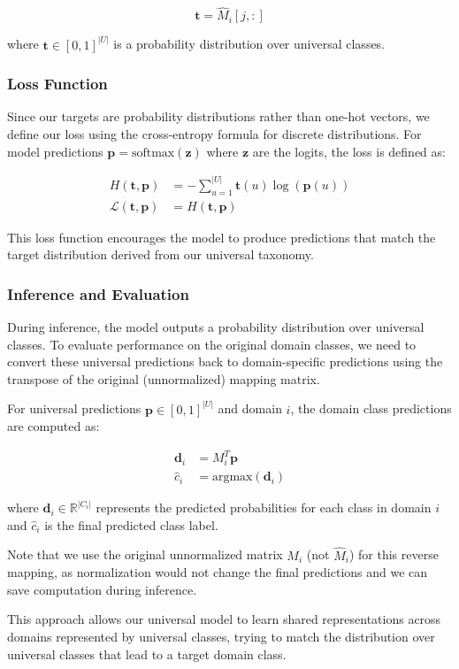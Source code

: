 \begin{equation}
      \mathbf{t} = \hat{M}_i[j, :]
\end{equation}

where $\mathbf{t} \in [0,1]^{|U|}$ is a probability distribution over universal classes.

\subsubsection{Loss Function}

Since our targets are probability distributions rather than one-hot vectors,
we define our loss using the cross-entropy formula for discrete distributions.
For model predictions $\mathbf{p} = \text{softmax}(\mathbf{z})$ where $\mathbf{z}$ are the logits,
the loss is defined as:

\begin{equation}
      \begin{aligned}
            H(\mathbf{t}, \mathbf{p})           & = -\sum_{u=1}^{|U|} \mathbf{t}(u) \log(\mathbf{p}(u)) \\
            \mathcal{L}(\mathbf{t}, \mathbf{p}) & = H(\mathbf{t}, \mathbf{p})
      \end{aligned}
\end{equation}

This loss function encourages the model to produce predictions that match
the target distribution derived from our universal taxonomy.

\subsubsection{Inference and Evaluation}

During inference, the model outputs a probability distribution over universal classes.
To evaluate performance on the original domain classes, we need to convert these universal predictions
back to domain-specific predictions using the transpose of the original (unnormalized) mapping matrix.

For universal predictions $\mathbf{p} \in [0,1]^{|U|}$ and domain $i$,
the domain class predictions are computed as:

\begin{equation}
      \begin{aligned}
            \mathbf{d}_i & = M_i^T \mathbf{p}            \\
            \hat{c}_i    & = \text{argmax}(\mathbf{d}_i)
      \end{aligned}
\end{equation}

where $\mathbf{d}_i \in \mathbb{R}^{|C_i|}$ represents the predicted probabilities for each class in domain $i$
and $\hat{c}_i$ is the final predicted class label.

Note that we use the original unnormalized matrix $M_i$ (not $\hat{M}_i$) for this reverse mapping,
as normalization would not change the final predictions and we can save computation during inference.

This approach allows our universal model to learn shared representations across domains
represented by universal classes, trying to match the distribution over universal classes
that lead to a target domain class.

